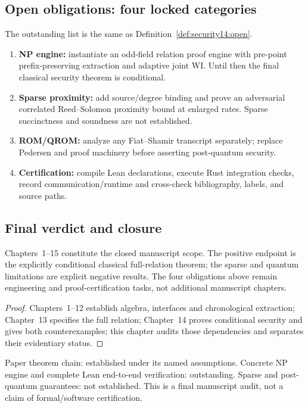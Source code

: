 \subsection{Open obligations: four locked categories}
The outstanding list is the same as Definition~\ref{def:security14:open}.
\begin{enumerate}[label=\textbf{O\arabic*.}]
\item \textbf{NP engine:} instantiate an odd-field relation proof engine with pre-point prefix-preserving extraction and adaptive joint WI. Until then the final classical security theorem is conditional.
\item \textbf{Sparse proximity:} add source/degree binding and prove an adversarial correlated Reed--Solomon proximity bound at enlarged rates. Sparse succinctness and soundness are not established.
\item \textbf{ROM/QROM:} analyze any Fiat--Shamir transcript separately; replace Pedersen and proof machinery before asserting post-quantum security.
\item \textbf{Certification:} compile Lean declarations, execute Rust integration checks, record communication/runtime and cross-check bibliography, labels, and source paths.
\end{enumerate}

\subsection{Final verdict and closure}
\begin{proposition}\label{prop:cert15:closure}
Chapters~1--15 constitute the closed manuscript scope. The positive endpoint is the explicitly conditional classical full-relation theorem; the sparse and quantum limitations are explicit negative results. The four obligations above remain engineering and proof-certification tasks, not additional manuscript chapters.
\end{proposition}
\begin{proof}
Chapters~1--12 establish algebra, interfaces and chronological extraction; Chapter~13 specifies the full relation; Chapter~14 proves conditional security and gives both counterexamples; this chapter audits those dependencies and separates their evidentiary status.
\end{proof}
\begin{remark}
Paper theorem chain: established under its named assumptions. Concrete NP engine and complete Lean end-to-end verification: outstanding. Sparse and post-quantum guarantees: not established. This is a final manuscript audit, not a claim of formal/software certification.
\end{remark}
